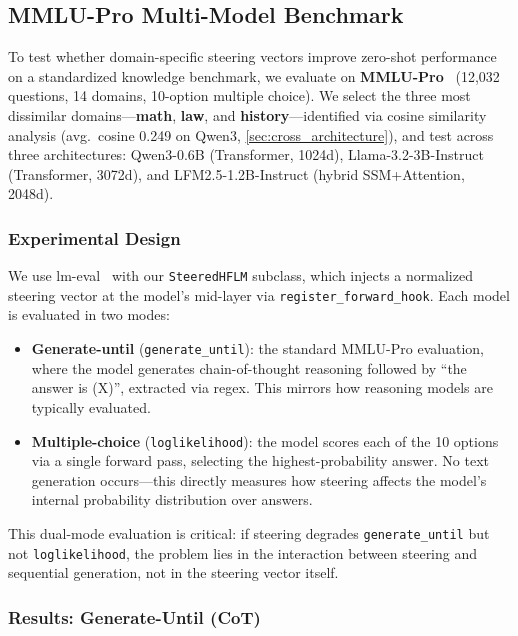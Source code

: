 \documentclass[11pt,a4paper]{article}
\begin{document}
\subsection{MMLU-Pro Multi-Model Benchmark}
\label{sec:mmlu_pro}

To test whether domain-specific steering vectors improve zero-shot performance on a standardized knowledge benchmark, we evaluate on \textbf{MMLU-Pro}~\cite{wang2024mmlu} (12,032 questions, 14 domains, 10-option multiple choice). We select the three most dissimilar domains---\textbf{math}, \textbf{law}, and \textbf{history}---identified via cosine similarity analysis (avg.\ cosine 0.249 on Qwen3, \cref{sec:cross_architecture}), and test across three architectures: Qwen3-0.6B (Transformer, 1024d), Llama-3.2-3B-Instruct (Transformer, 3072d), and LFM2.5-1.2B-Instruct (hybrid SSM+Attention, 2048d).

\subsubsection{Experimental Design}

We use lm-eval~\cite{eval-harness} with our \texttt{SteeredHFLM} subclass, which injects a normalized steering vector at the model's mid-layer via \texttt{register\_forward\_hook}. Each model is evaluated in two modes:
\begin{itemize}
    \item \textbf{Generate-until} (\texttt{generate\_until}): the standard MMLU-Pro evaluation, where the model generates chain-of-thought reasoning followed by ``the answer is (X)'', extracted via regex. This mirrors how reasoning models are typically evaluated.
    \item \textbf{Multiple-choice} (\texttt{loglikelihood}): the model scores each of the 10 options via a single forward pass, selecting the highest-probability answer. No text generation occurs---this directly measures how steering affects the model's internal probability distribution over answers.
\end{itemize}

This dual-mode evaluation is critical: if steering degrades \texttt{generate\_until} but not \texttt{loglikelihood}, the problem lies in the interaction between steering and sequential generation, not in the steering vector itself.

\subsubsection{Results: Generate-Until (CoT)}
\end{document}
